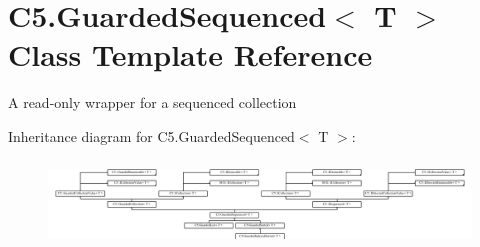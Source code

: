 \hypertarget{class_c5_1_1_guarded_sequenced}{}\section{C5.\+Guarded\+Sequenced$<$ T $>$ Class Template Reference}
\label{class_c5_1_1_guarded_sequenced}


A read-\/only wrapper for a sequenced collection  


Inheritance diagram for C5.\+Guarded\+Sequenced$<$ T $>$\+:\begin{figure}[H]
\begin{center}
\leavevmode
\includegraphics[height=2.300470cm]{class_c5_1_1_guarded_sequenced}
\end{center}
\end{figure}
